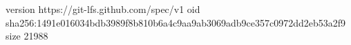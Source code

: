 version https://git-lfs.github.com/spec/v1
oid sha256:1491e016034bdb3989f8b810b6a4c9aa9ab3069adb9ce357c0972dd2eb53a2f9
size 21988
